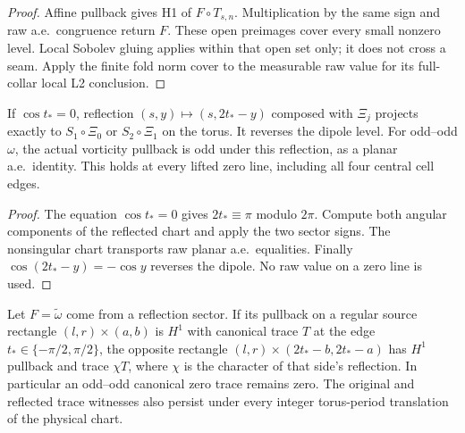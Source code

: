 \begin{proof}
\leanok
Affine pullback gives H1 of $F\circ T_{s,n}$.
Multiplication by the same sign and raw a.e.\ congruence return $F$.
These open preimages cover every small nonzero level.
Local Sobolev gluing applies within that open set only; it does not cross a seam.
Apply the finite fold norm cover to the measurable raw value for its
full-collar local L2 conclusion.
\end{proof}

\begin{lemma}
\label{lem:odd-odd-diagonal-reflection-parity}
\leanok
If $\cos t_*=0$, reflection $(s,y)\mapsto(s,2t_*-y)$ composed with $\Xi_j$
projects exactly to $S_1\circ\Xi_0$ or $S_2\circ\Xi_1$ on the torus.
It reverses the dipole level.
For odd--odd $\omega$, the actual vorticity pullback is odd under this reflection,
as a planar a.e.\ identity.
This holds at every lifted zero line, including all four central cell edges.
\end{lemma}

\begin{proof}
\leanok
The equation $\cos t_*=0$ gives $2t_*\equiv\pi$ modulo $2\pi$.
Compute both angular components of the reflected chart and apply the two
sector signs. The nonsingular chart transports raw planar a.e.\ equalities.
Finally $\cos(2t_*-y)=-\cos y$ reverses the dipole.
No raw value on a zero line is used.
\end{proof}

\begin{lemma}
\label{lem:odd-odd-reflected-edge-traces}
\leanok
Let $F=\widetilde\omega$ come from a reflection sector. If its pullback
on a regular source rectangle $(l,r)\times(a,b)$ is $H^1$ with
canonical trace $T$ at the edge $t_*\in\{-\pi/2,\pi/2\}$, the opposite
rectangle $(l,r)\times(2t_*-b,2t_*-a)$ has $H^1$ pullback and trace
$\chi T$, where $\chi$ is the character of that side's reflection.
In particular an odd--odd canonical zero trace remains zero.
The original and reflected trace witnesses also persist under every
integer torus-period translation of the physical chart.
\end{lemma}

